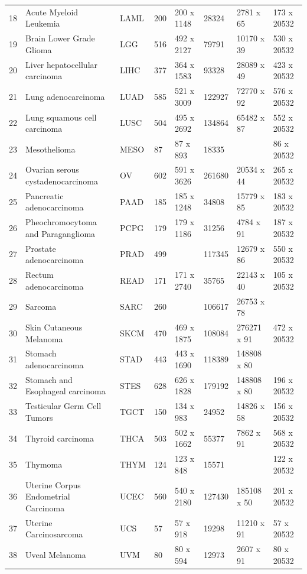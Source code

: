 \begin{widetable}[h]
\begin{tabular}{rlllllll}
  18 & Acute Myeloid Leukemia & LAML & 200 & 200 x 1148 & 28324 & 2781 x 65 & 173 x 20532 \\ 
  19 & Brain Lower Grade Glioma & LGG & 516 & 492 x 2127 & 79791 & 10170 x 39 & 530 x 20532 \\ 
  20 & Liver hepatocellular carcinoma & LIHC & 377 & 364 x 1583 & 93328 & 28089 x 49 & 423 x 20532 \\ 
  21 & Lung adenocarcinoma & LUAD & 585 & 521 x 3009 & 122927 & 72770 x 92 & 576 x 20532 \\ 
  22 & Lung squamous cell carcinoma & LUSC & 504 & 495 x 2692 & 134864 & 65482 x 87 & 552 x 20532 \\ 
  23 & Mesothelioma & MESO & 87 & 87 x 893 & 18335 &  & 86 x 20532 \\ 
  24 & Ovarian serous cystadenocarcinoma & OV & 602 & 591 x 3626 & 261680 & 20534 x 44 & 265 x 20532 \\ 
  25 & Pancreatic adenocarcinoma & PAAD & 185 & 185 x 1248 & 34808 & 15779 x 85 & 183 x 20532 \\ 
  26 & Pheochromocytoma and Paraganglioma & PCPG & 179 & 179 x 1186 & 31256 & 4784 x 91 & 187 x 20532 \\ 
  27 & Prostate adenocarcinoma & PRAD & 499 &  & 117345 & 12679 x 86 & 550 x 20532 \\ 
  28 & Rectum adenocarcinoma & READ & 171 & 171 x 2740 & 35765 & 22143 x 40 & 105 x 20532 \\ 
  29 & Sarcoma & SARC & 260 &  & 106617 & 26753 x 78 &  \\ 
  30 & Skin Cutaneous Melanoma & SKCM & 470 & 469 x 1875 & 108084 & 276271 x 91 & 472 x 20532 \\ 
  31 & Stomach adenocarcinoma & STAD & 443 & 443 x 1690 & 118389 & 148808 x 80 &  \\ 
  32 & Stomach and Esophageal carcinoma & STES & 628 & 626 x 1828 & 179192 & 148808 x 80 & 196 x 20532 \\ 
  33 & Testicular Germ Cell Tumors & TGCT & 150 & 134 x 983 & 24952 & 14826 x 58 & 156 x 20532 \\ 
  34 & Thyroid carcinoma & THCA & 503 & 502 x 1662 & 55377 & 7862 x 91 & 568 x 20532 \\ 
  35 & Thymoma & THYM & 124 & 123 x 848 & 15571 &  & 122 x 20532 \\ 
  36 & Uterine Corpus Endometrial Carcinoma & UCEC & 560 & 540 x 2180 & 127430 & 185108 x 50 & 201 x 20532 \\ 
  37 & Uterine Carcinosarcoma & UCS & 57 & 57 x 918 & 19298 & 11210 x 91 & 57 x 20532 \\ 
  38 & Uveal Melanoma & UVM & 80 & 80 x 594 & 12973 & 2607 x 91 & 80 x 20532 \\ 
   \bottomrule
\end{tabular}
\end{widetable}

